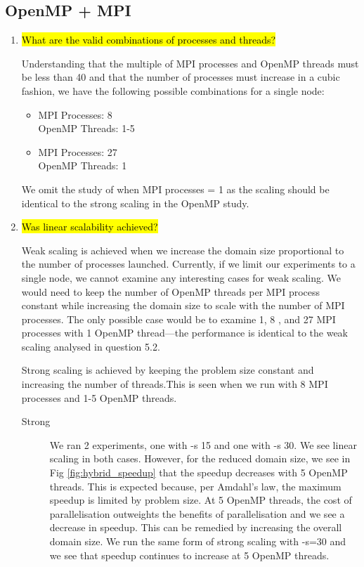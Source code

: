 \documentclass{article}
\begin{document}
\subsection{OpenMP + MPI}
\begin{enumerate}
	\item \hl{What are the valid combinations of processes and threads?}

	Understanding that the multiple of MPI processes and OpenMP threads must be less than 40 and that the number of processes must increase in a cubic fashion, we have the following possible combinations for a single node:
	\begin{itemize}
		\item   MPI Processes: 8\\
				OpenMP Threads: 1-5
		\item	MPI Processes: 27\\
				OpenMP Threads: 1
	\end{itemize}
	
	We omit the study of when MPI processes = 1 as the scaling should be identical to the strong scaling in the OpenMP study.
	
	\item \hl{Was linear scalability achieved?}
	
	Weak scaling is achieved when we increase the domain size proportional to the number of processes launched. Currently, if we limit our experiments to a single node, we cannot examine any interesting cases for weak scaling. We would need to keep the number of OpenMP threads per MPI process constant while increasing the domain size to scale with the number of MPI processes. The only possible case would be to examine 1, 8 , and 27 MPI processes with 1 OpenMP thread---the performance is identical to the weak scaling analysed in question 5.2.
	
	Strong scaling is achieved by keeping the problem size constant and increasing the number of threads.This is seen when we run with 8 MPI processes and 1-5 OpenMP threads. 
	
	\begin{description}
		\item[Strong] We ran 2 experiments, one with -s 15 and one with -s 30. We see linear scaling in both cases. However, for the reduced domain size, we see in Fig \ref{fig:hybrid_speedup} that the speedup decreases with 5 OpenMP threads. This is expected because, per Amdahl's law, the maximum speedup is limited by problem size. At 5 OpenMP threads, the cost of parallelisation outweights the benefits of parallelisation and we see a decrease in speedup. This can be remedied by increasing the overall domain size. We run the same form of strong scaling with -s=30 and we see that speedup continues to increase at 5 OpenMP threads.
	\end{description}
		

\end{enumerate}
\end{document}
